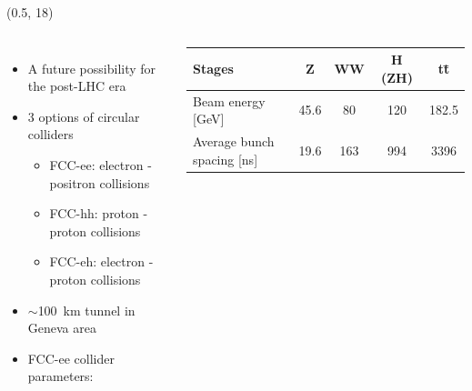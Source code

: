 \documentclass[final,xcolor={dvipsnames,svgnames,x11names,table}]{beamer}
\begin{document}
\begin{frame}
\begin{textblock}{43}(0.5, 18)
  \begin{tcolorbox}[title=The Future Circular Collider Experiment (FCC)]

  \begin{columns}
      \begin{itemize}
        \item A future possibility for the post-LHC era \vspace{0.2cm}
        \item 3 options of circular colliders \vspace{0.2cm}
          \begin{itemize}
            \item FCC-ee: electron - positron collisions
            \item FCC-hh: proton - proton collisions
            \item FCC-eh: electron - proton collisions
          \end{itemize}
        \item $\sim$100~km tunnel in Geneva area \vspace{0.2cm}
        \item FCC-ee collider parameters: \vspace{0.2cm}
      \end{itemize}
        \centering
      	\begin{tabular}{| l | c | c | c | c |}
        	\toprule
      	   Stages & Z & WW & H (ZH) & t\={t} \\
      	   \midrule
           Beam energy [GeV] & 45.6 & 80 & 120 & 182.5 \\
           Average bunch spacing [ns] & 19.6 & 163 & 994 & 3396\\
      	   \bottomrule
      	\end{tabular}


\end{columns}
\end{tcolorbox}
\end{textblock}
\end{frame}
\end{document}
